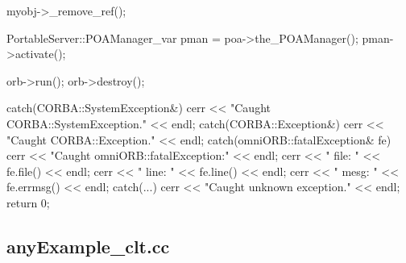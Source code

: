 \documentclass[11pt,twoside,a4paper]{book}
\begin{document}
\begin{cxxlisting}
{{    myobj->_remove_ref();

    PortableServer::POAManager_var pman = poa->the_POAManager();
    pman->activate();

    orb->run();
    orb->destroy();
  }
  catch(CORBA::SystemException&) {
    cerr << "Caught CORBA::SystemException." << endl;
  }
  catch(CORBA::Exception&) {
    cerr << "Caught CORBA::Exception." << endl;
  }
  catch(omniORB::fatalException& fe) {
    cerr << "Caught omniORB::fatalException:" << endl;
    cerr << "  file: " << fe.file() << endl;
    cerr << "  line: " << fe.line() << endl;
    cerr << "  mesg: " << fe.errmsg() << endl;
  }
  catch(...) {
    cerr << "Caught unknown exception." << endl;
  }
  return 0;
}
\end{cxxlisting}


\clearpage

\subsection{anyExample\_clt.cc}
\end{document}
